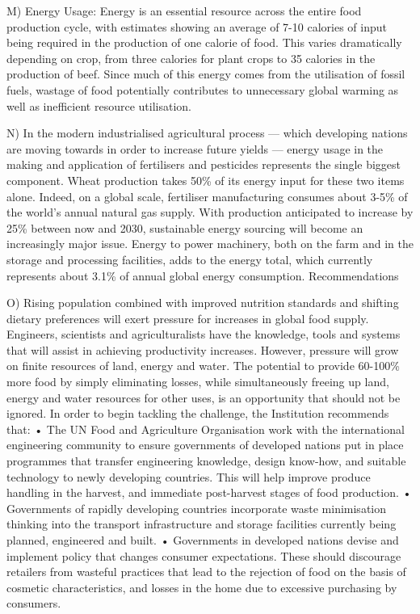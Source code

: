 \documentclass[UTF8,11pt]{ctexart}
\begin{document}
M) Energy Usage: Energy is an essential resource across the entire food production cycle, with estimates showing an average of 7-10 calories of input being required in the production of one calorie of food. This varies dramatically depending on crop, from three calories for plant crops to 35 calories in the production of beef. Since much of this energy comes from the utilisation of fossil fuels, wastage of food potentially contributes to unnecessary global warming as well as inefficient resource utilisation.


N) In the modern industrialised agricultural process — which developing nations are moving towards in order to increase future yields — energy usage in the making and application of fertilisers and pesticides represents the single biggest component. Wheat production takes 50\% of its energy input for these two items alone. Indeed, on a global scale, fertiliser manufacturing consumes about 3-5\% of the world’s annual natural gas supply. With production anticipated to increase by 25\% between now and 2030, sustainable energy sourcing will become an increasingly major issue. Energy to power machinery, both on the farm and in the storage and processing facilities, adds to the energy total, which currently represents about 3.1\% of annual global energy consumption. Recommendations


O) Rising population combined with improved nutrition standards and shifting dietary preferences will exert pressure for increases in global food supply. Engineers, scientists and agriculturalists have the knowledge, tools and systems that will assist in achieving productivity increases. However, pressure will grow on finite resources of land, energy and water. The potential to provide 60-100\% more food by simply eliminating losses, while simultaneously freeing up land, energy and water resources for other uses, is an opportunity that should not be ignored. In order to begin tackling the challenge, the Institution recommends that: • The UN Food and Agriculture Organisation work with the international engineering community to ensure governments of developed nations put in place programmes that transfer engineering knowledge, design know-how, and suitable technology to newly developing countries. This will help improve produce handling in the harvest, and immediate post-harvest stages of food production. • Governments of rapidly developing countries incorporate waste minimisation thinking into the transport infrastructure and storage facilities currently being planned, engineered and built. • Governments in developed nations devise and implement policy that changes consumer expectations. These should discourage retailers from wasteful practices that lead to the rejection of food on the basis of cosmetic characteristics, and losses in the home due to excessive purchasing by consumers.
\end{document}
